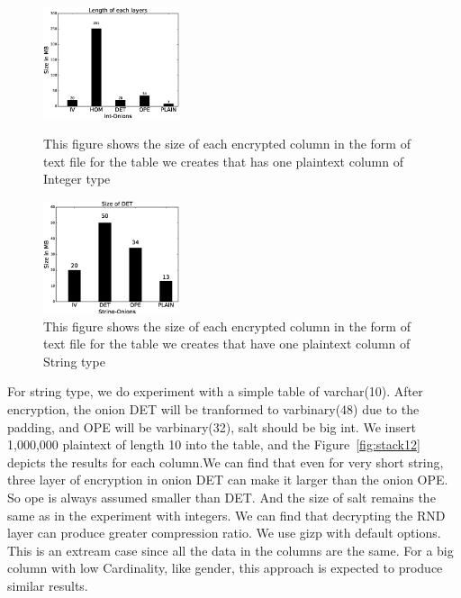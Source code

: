 \begin{figure}   
  \begin{minipage}[t]{0.5\linewidth}  
    \centering   
    \includegraphics[width=4.0cm]{images/size-of-each-onion.eps}   
    \caption{This figure shows the size of each encrypted column in the form of text file for the table we creates that has one plaintext column of Integer type}   
    \label{fig:side:a}   
  \end{minipage}%
  \begin{minipage}[t]{0.5\linewidth}   
    \centering   
    \includegraphics[width=4.0cm]{images/det-rnd.eps}   
    \caption{This figure shows the size of each encrypted column in the form of text file for the table we creates that have one plaintext column of String type}   
    \label{fig:side:b}   
  \end{minipage}   
\end{figure}





For string type, we do experiment with a simple table of varchar(10). After encryption, the onion DET will be tranformed to varbinary(48) due to the padding, and OPE will be varbinary(32), salt should be big int. We insert 1,000,000 plaintext of length 10 into the table, and the Figure~\ref{fig:stack12} depicts the results for each column.We can find that even for very short string, three layer of encryption in onion DET can make it larger than the onion OPE. So ope is always assumed  smaller than DET. And the size of salt remains the same as in the experiment with integers. We can find that decrypting the RND layer can produce greater compression ratio. We use gizp with default options. This is an extream case since all the data in the columns are the same. For a big column with low Cardinality, like gender, this approach is expected to produce similar results. 


